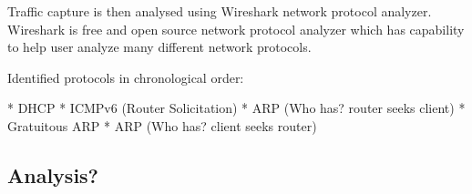 Traffic capture is then analysed using Wireshark network protocol
analyzer. Wireshark is free and open source network protocol analyzer
which has capability to help user analyze many different network
protocols.



Identified protocols in chronological order:

* DHCP
* ICMPv6 (Router Solicitation)
* ARP (Who has? router seeks client)
* Gratuitous ARP
* ARP (Who has? client seeks router)

\subsection{Analysis?}
